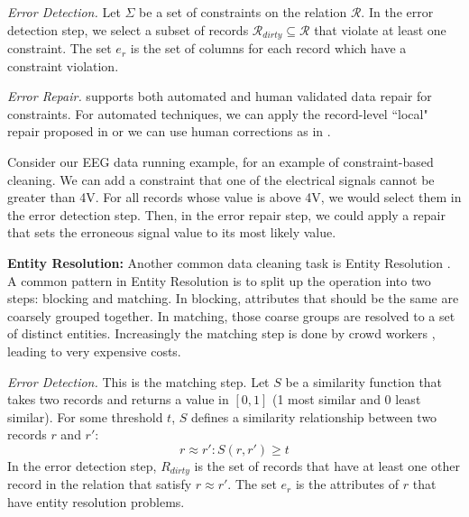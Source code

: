 \vspace{0.5em}

\emph{Error Detection. } Let $\Sigma$ be a set of constraints on the relation $\mathcal{R}$. 
In the error detection step, we select a subset of records $\mathcal{R}_{dirty} \subseteq \mathcal{R}$ that violate at least one constraint.
The set $e_r$ is the set of columns for each record which have a constraint violation.

\vspace{0.5em}

\emph{Error Repair. } \sys supports both automated and human validated data repair for constraints. For automated techniques, we can apply the record-level ``local" repair proposed in \cite{DBLP:journals/pvldb/FanLMTY10} or we can use human corrections as in \cite{DBLP:journals/pvldb/YakoutENOI11}. 

\begin{example}
Consider our EEG data running example, for an example of constraint-based cleaning.
We can add a constraint that one of the electrical signals cannot be greater than 4V.
For all records whose value is above 4V, we would select them in the error detection step.
Then, in the error repair step, we could apply a repair that sets the erroneous signal value to its most likely value.
\end{example}

\vspace{0.5em}

\noindent\textbf{Entity Resolution: }
Another common data cleaning task is Entity Resolution \cite{gokhale2014corleone, DBLP:journals/pvldb/KopckeTR10, wang2012crowder}.
A common pattern in Entity Resolution is to split up the operation into two steps: blocking and matching.
In blocking, attributes that should be the same are coarsely grouped together.
In matching, those coarse groups are resolved to a set of distinct entities.
Increasingly the matching step is done by crowd workers \cite{wang2012crowder, gokhale2014corleone}, leading to very expensive costs.

\vspace{0.5em}

\emph{Error Detection. } This is the matching step. Let $S$ be a similarity function that takes two records and returns a value in $[0,1]$ (1 most similar and 0 least similar). For some threshold $t$, $S$ defines a similarity relationship between two records $r$ and $r'$:
\[
r \approx r' : S(r,r') \ge t
\] 
In the error detection step, $R_{dirty}$ is the set of records that have at least one other record in the relation that satisfy $r \approx r'$.
The set $e_r$ is the attributes of $r$ that have entity resolution problems.

